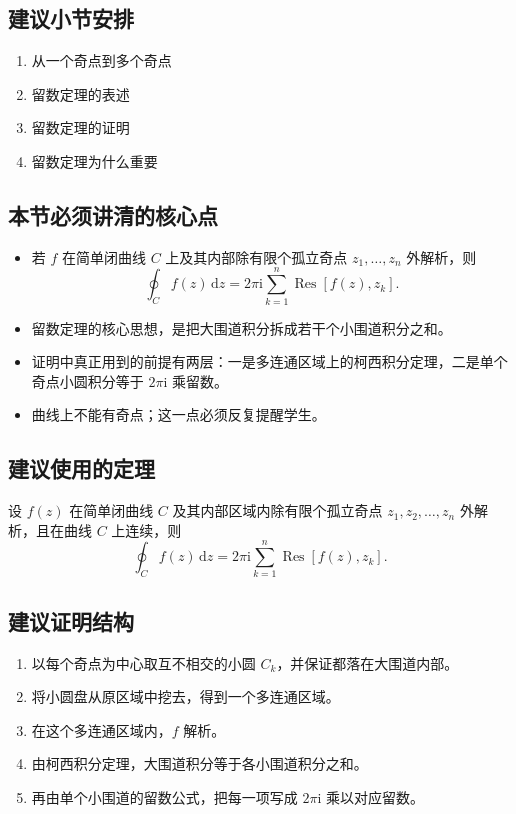 \subsection*{建议小节安排}
\begin{enumerate}
    \item 从一个奇点到多个奇点
    \item 留数定理的表述
    \item 留数定理的证明
    \item 留数定理为什么重要
\end{enumerate}

\subsection*{本节必须讲清的核心点}
\begin{itemize}
    \item 若 $f$ 在简单闭曲线 $C$ 上及其内部除有限个孤立奇点 $z_1,\dots,z_n$ 外解析，则
    \[
        \oint_C f(z)\,\mathrm{d}z
        =
        2\pi \mathrm{i}\sum_{k=1}^{n}\operatorname{Res}[f(z),z_k].
    \]
    \item 留数定理的核心思想，是把大围道积分拆成若干个小围道积分之和。
    \item 证明中真正用到的前提有两层：一是多连通区域上的柯西积分定理，二是单个奇点小圆积分等于 $2\pi \mathrm{i}$ 乘留数。
    \item 曲线上不能有奇点；这一点必须反复提醒学生。
\end{itemize}

\subsection*{建议使用的定理}
\begin{zhongyao}[留数定理]
设 $f(z)$ 在简单闭曲线 $C$ 及其内部区域内除有限个孤立奇点 $z_1,z_2,\dots,z_n$ 外解析，且在曲线 $C$ 上连续，则
\[
    \oint_C f(z)\,\mathrm{d}z
    =
    2\pi \mathrm{i}\sum_{k=1}^{n}\operatorname{Res}[f(z),z_k].
\]
\end{zhongyao}

\subsection*{建议证明结构}
\begin{enumerate}
    \item 以每个奇点为中心取互不相交的小圆 $C_k$，并保证都落在大围道内部。
    \item 将小圆盘从原区域中挖去，得到一个多连通区域。
    \item 在这个多连通区域内，$f$ 解析。
    \item 由柯西积分定理，大围道积分等于各小围道积分之和。
    \item 再由单个小围道的留数公式，把每一项写成 $2\pi \mathrm{i}$ 乘以对应留数。
\end{enumerate}

